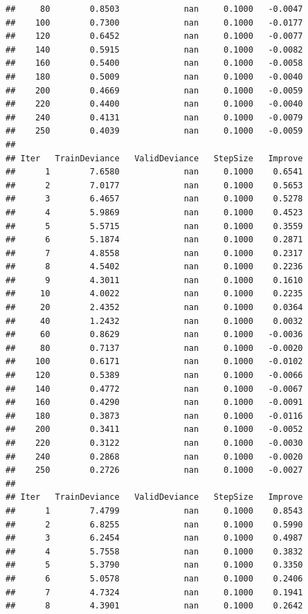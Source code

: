 \documentclass[]{book}
\begin{document}
\begin{verbatim}
##     80        0.8503             nan     0.1000   -0.0047
##    100        0.7300             nan     0.1000   -0.0177
##    120        0.6452             nan     0.1000   -0.0077
##    140        0.5915             nan     0.1000   -0.0082
##    160        0.5400             nan     0.1000   -0.0058
##    180        0.5009             nan     0.1000   -0.0040
##    200        0.4669             nan     0.1000   -0.0059
##    220        0.4400             nan     0.1000   -0.0040
##    240        0.4131             nan     0.1000   -0.0079
##    250        0.4039             nan     0.1000   -0.0059
## 
## Iter   TrainDeviance   ValidDeviance   StepSize   Improve
##      1        7.6580             nan     0.1000    0.6541
##      2        7.0177             nan     0.1000    0.5653
##      3        6.4657             nan     0.1000    0.5278
##      4        5.9869             nan     0.1000    0.4523
##      5        5.5715             nan     0.1000    0.3559
##      6        5.1874             nan     0.1000    0.2871
##      7        4.8558             nan     0.1000    0.2317
##      8        4.5402             nan     0.1000    0.2236
##      9        4.3011             nan     0.1000    0.1610
##     10        4.0022             nan     0.1000    0.2235
##     20        2.4352             nan     0.1000    0.0364
##     40        1.2432             nan     0.1000    0.0032
##     60        0.8629             nan     0.1000   -0.0036
##     80        0.7137             nan     0.1000   -0.0020
##    100        0.6171             nan     0.1000   -0.0102
##    120        0.5389             nan     0.1000   -0.0066
##    140        0.4772             nan     0.1000   -0.0067
##    160        0.4290             nan     0.1000   -0.0091
##    180        0.3873             nan     0.1000   -0.0116
##    200        0.3411             nan     0.1000   -0.0052
##    220        0.3122             nan     0.1000   -0.0030
##    240        0.2868             nan     0.1000   -0.0020
##    250        0.2726             nan     0.1000   -0.0027
## 
## Iter   TrainDeviance   ValidDeviance   StepSize   Improve
##      1        7.4799             nan     0.1000    0.8543
##      2        6.8255             nan     0.1000    0.5990
##      3        6.2454             nan     0.1000    0.4987
##      4        5.7558             nan     0.1000    0.3832
##      5        5.3790             nan     0.1000    0.3350
##      6        5.0578             nan     0.1000    0.2406
##      7        4.7324             nan     0.1000    0.1941
##      8        4.3901             nan     0.1000    0.2642

\end{verbatim}
\end{document}
